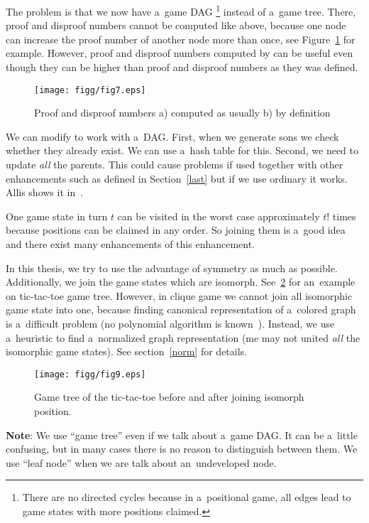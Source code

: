 The problem is that we now have a~game DAG \footnote{There are no directed cycles
because in a~positional game, all edges lead to game states with more positions
claimed.} instead of a~game tree. There, proof and disproof numbers cannot be
computed like above, because one node can increase the proof number of another
node more than once, see Figure~\ref{sedm} for example. 
However, proof and disproof numbers computed by  can be useful even
though they can be higher than proof and disproof numbers as they was defined. 

\begin{figure}
	\centerline{\mbox{\texttt{[image: figg/fig7.eps]}}}
	\caption{Proof and disproof numbers a) computed as usually b) by definition}
	\label{sedm}
\end{figure}

We can modify  to work with a~DAG. First, when we generate sons we
check whether they already exist. We can use a~hash table for this. Second, we
need to update \emph{all} the parents. This could cause problems if used
together with other enhancements such as  defined in
Section~\ref{last} but if we use ordinary  it works. Allis shows it in~\cite{allis}.

One game state in turn $t$ can be visited in the worst case approximately $t!$ times because
positions can be claimed in any order. So joining them is a~good idea and
there exist many enhancements of this enhancement.

In this thesis, we try to use the advantage of symmetry as much as possible.
Additionally, we join the game states which are isomorph. See~\ref{devet}
for an~example on tic-tac-toe game tree. However, in clique game we cannot join
all isomorphic game state into one, because finding canonical 
representation of a~colored graph is a~difficult problem (no polynomial algorithm
is known~\cite{canonical}).
Instead, we use a~heuristic to find a~normalized graph representation 
(me may not united \emph{all} the isomorphic game states). 
See section~\ref{norm} for details.

\begin{figure}
	\centerline{\mbox{\texttt{[image: figg/fig9.eps]}}}
	\caption{Game tree of the tic-tac-toe before and after joining isomorph position.}
	\label{devet}
\end{figure}

\textbf{Note}: We use ``game tree'' even if we talk about a~game DAG. It can be a~little confusing,
but in many cases there is no reason to distinguish between them. 
We use ``leaf node'' when we are talk about an~undeveloped node. 

